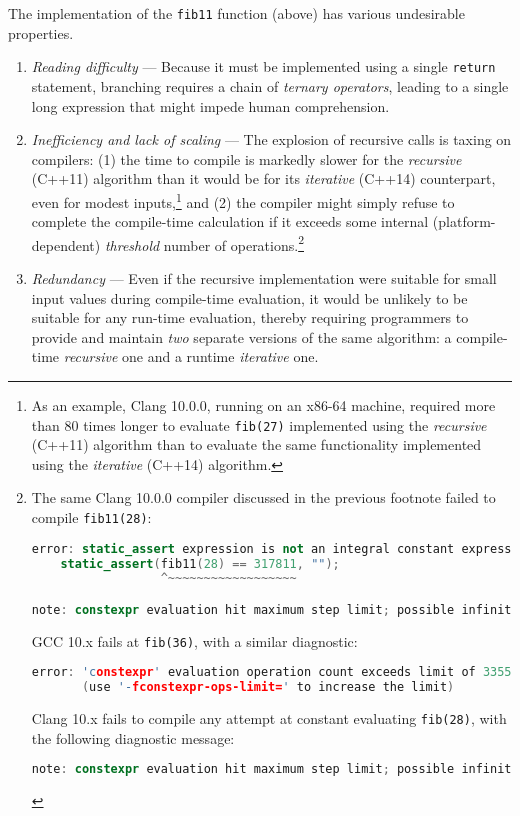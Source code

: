 \noindent The implementation of the \texttt{fib11} function (above) has various
undesirable properties.
\begin{enumerate}
\item{\emph{Reading difficulty} — Because it must be implemented using a single \texttt{return} statement, branching requires a chain of \emph{ternary operators}, leading to a single long expression that might impede human comprehension.}
\item{\emph{Inefficiency and lack of scaling} — The explosion of recursive calls is taxing on compilers: (1) the time to compile is markedly slower for the \emph{recursive} (C++11) algorithm than it would be for its \emph{iterative} (C++14) counterpart, even for modest inputs,{\cprotect\footnote{As an example, Clang 10.0.0, running on an x86-64 machine, required more than 80 times longer to evaluate \texttt{fib(27)} implemented using the \emph{recursive} (C++11) algorithm than to evaluate the same functionality implemented using the \emph{iterative} (C++14) algorithm.}} and (2) the compiler might simply refuse to complete the compile-time calculation if it exceeds some internal (platform-dependent) \emph{threshold} number of operations.{\cprotect\footnote{The same Clang 10.0.0 compiler discussed in the previous footnote failed to compile \texttt{fib11(28)}:

\begin{lstlisting}[language=C++, basicstyle={\ttfamily\footnotesize}]
error: static_assert expression is not an integral constant expression
    static_assert(fib11(28) == 317811, "");
                  ^~~~~~~~~~~~~~~~~~~

note: constexpr evaluation hit maximum step limit; possible infinite loop?
\end{lstlisting}

\noindent GCC 10.x fails at \texttt{fib(36)}, with a similar diagnostic:

\begin{lstlisting}[language=C++, basicstyle={\ttfamily\footnotesize}]
error: 'constexpr' evaluation operation count exceeds limit of 33554432
       (use '-fconstexpr-ops-limit=' to increase the limit)
\end{lstlisting}

\noindent Clang 10.x fails to compile any attempt at constant evaluating \texttt{fib(28)}, with the following diagnostic message:

\begin{lstlisting}[language=C++, basicstyle={\ttfamily\footnotesize}]
note: constexpr evaluation hit maximum step limit; possible infinite loop?
\end{lstlisting}
}} %
} %
\item{\emph{Redundancy} — Even if the recursive implementation were suitable for small input values during compile-time evaluation, it would be unlikely to be suitable for any run-time evaluation, thereby requiring programmers to provide and maintain \emph{two} separate versions of the same algorithm: a compile-time \emph{recursive} one and a runtime \emph{iterative} one.}
\end{enumerate}


